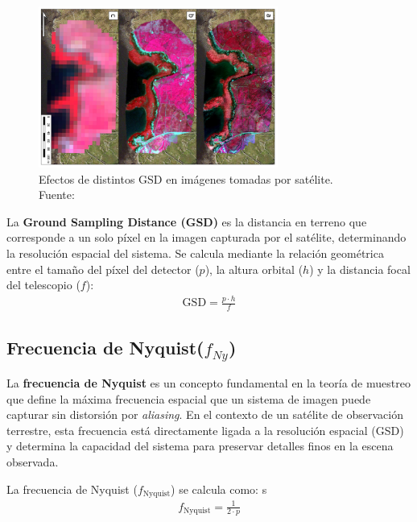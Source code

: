 \begin{figure}[H]
    \centering
    \includegraphics[width=0.7\textwidth]{3.Conceptos_Previos/Comparison-of-the-multispectral-ground-sampling-distance-GSD-from-each-of-the-three.ppm.png}
    \caption{Efectos de distintos GSD en imágenes tomadas por satélite.\\ Fuente: \cite{rossiter2020gsd_comparison}}
    \label{fig:gsdexample}
\end{figure}

La \textbf{Ground Sampling Distance (GSD)} es la distancia en terreno que corresponde a un solo píxel en la imagen capturada por el satélite, determinando la resolución espacial del sistema. Se calcula mediante la relación geométrica entre el tamaño del píxel del detector (\( p \)), la altura orbital (\( h \)) y la distancia focal del telescopio (\( f \)):
\begin{align}
\text{GSD} = \frac{p \cdot h}{f}
\end{align}


\subsection{Frecuencia de Nyquist($f_{Ny}$)}

La \textbf{frecuencia de Nyquist} es un concepto fundamental en la teoría de muestreo que define la máxima frecuencia espacial que un sistema de imagen puede capturar sin distorsión por \textit{aliasing}. En el contexto de un satélite de observación terrestre, esta frecuencia está directamente ligada a la resolución espacial (GSD) y determina la capacidad del sistema para preservar detalles finos en la escena observada.

La frecuencia de Nyquist (\( f_{\text{Nyquist}} \)) se calcula como:
s
\begin{align}
f_{\text{Nyquist}} = \frac{1}{2 \cdot p}
\end{align}

